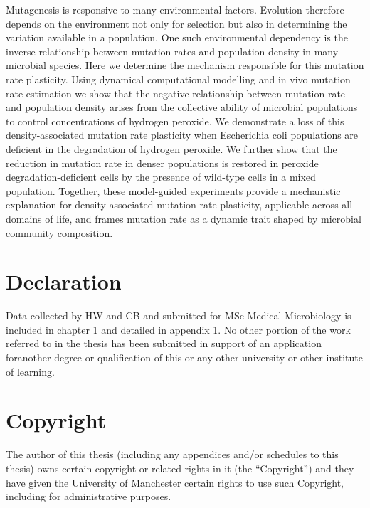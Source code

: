 \documentclass[
  12pt,
  letterpaper,
  DIV=11,
  numbers=noendperiod]{scrreprt}
\begin{document}
Mutagenesis is responsive to many environmental factors. Evolution
therefore depends on the environment not only for selection but also in
determining the variation available in a population. One such
environmental dependency is the inverse relationship between mutation
rates and population density in many microbial species. Here we
determine the mechanism responsible for this mutation rate plasticity.
Using dynamical computational modelling and in vivo mutation rate
estimation we show that the negative relationship between mutation rate
and population density arises from the collective ability of microbial
populations to control concentrations of hydrogen peroxide. We
demonstrate a loss of this density-associated mutation rate plasticity
when Escherichia coli populations are deficient in the degradation of
hydrogen peroxide. We further show that the reduction in mutation rate
in denser populations is restored in peroxide degradation-deficient
cells by the presence of wild-type cells in a mixed population.
Together, these model-guided experiments provide a mechanistic
explanation for density-associated mutation rate plasticity, applicable
across all domains of life, and frames mutation rate as a dynamic trait
shaped by microbial community composition.


\hypertarget{declaration}{%
\chapter*{Declaration}\label{declaration}}


Data collected by HW and CB and submitted for MSc Medical Microbiology
is included in chapter 1 and detailed in appendix 1. No other portion of
the work referred to in the thesis has been submitted in support of an
application foranother degree or qualification of this or any other
university or other institute of learning.


\hypertarget{copyright}{%
\chapter*{Copyright}\label{copyright}}


The author of this thesis (including any appendices and/or schedules to
this thesis) owns certain copyright or related rights in it (the
``Copyright'') and they have given the University of Manchester certain
rights to use such Copyright, including for administrative purposes.
\end{document}

